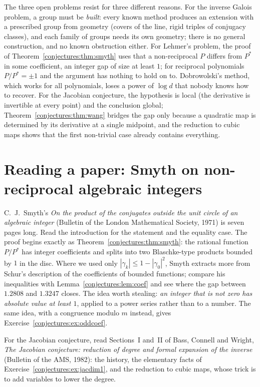 The three open problems resist for three different reasons. For the inverse Galois problem, a group must be \emph{built}: every known method produces an
extension with a prescribed group from geometry (covers of the line, rigid triples of conjugacy classes), and each family of groups needs its own geometry;
there is no general construction, and no known obstruction either. For Lehmer's problem, the proof of Theorem~\ref{conjectures:thm:smyth} uses that a non-reciprocal
$P$ differs from $P^*$ in some coefficient, an integer gap of size at least $1$; for reciprocal polynomials $P/P^*=\pm1$ and the argument has nothing to hold
on to. Dobrowolski's method, which works for all polynomials, loses a power of $\log d$ that nobody knows how to recover. For the Jacobian conjecture, the
hypothesis is local (the derivative is invertible at every point) and the conclusion global; Theorem~\ref{conjectures:thm:wang} bridges the gap only because a quadratic
map is determined by its derivative at a single midpoint, and the reduction to cubic maps shows that the first non-trivial case already contains everything.

\section{Reading a paper: Smyth on non-reciprocal algebraic integers}

C.~J.~Smyth's \emph{On the product of the conjugates outside the unit circle of an algebraic integer} (Bulletin of the London Mathematical Society, 1971) is
seven pages long. Read the introduction for the statement and the equality case. The proof begins exactly as Theorem~\ref{conjectures:thm:smyth}: the rational function
$P/P^*$ has integer coefficients and splits into two Blaschke-type products bounded by $1$ in the disc. Where we used only $|\gamma_k|\le1-|\gamma_0|^2$,
Smyth extracts more from Schur's description of the coefficients of bounded functions; compare his inequalities with
Lemma~\ref{conjectures:lem:coef} and see where the gap between $1.2808$ and $1.3247$ closes. The idea worth stealing: \emph{an integer that is not zero has absolute
value at least $1$}, applied to a power series rather than to a number. The same idea, with a congruence modulo $m$ instead, gives Exercise~\ref{conjectures:ex:oddcoef}.

For the Jacobian conjecture, read Sections~I and~II of Bass, Connell and Wright, \emph{The Jacobian conjecture: reduction of degree and formal expansion
of the inverse} (Bulletin of the AMS, 1982): the history, the elementary facts of Exercise~\ref{conjectures:ex:jacdim1}, and the reduction to cubic maps, whose trick is
to add variables to lower the degree.

